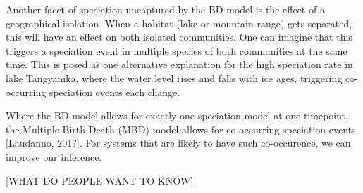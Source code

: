 Another facet of speciation uncaptured by the BD model is the
effect of a geographical isolation. When a habitat (lake or mountain range)
gets separated, this will have an effect on both isolated communities.
One can imagine that this triggers a speciation event in multiple species
of both communities at the same time. This is posed as one alternative
explanation for the high speciation rate in lake Tangyanika, where the water 
level rises and falls with ice ages, triggering co-occurring speciation
events each change. 

%
%
%

Where the BD model allows for exactly one speciation model at one timepoint,
the Multiple-Birth Death (MBD) model allows for co-occurring 
speciation events [Laudanno, 201?]. For systems that are likely
to have such co-occurence, we can improve our inference.







[WHAT DO PEOPLE WANT TO KNOW]
